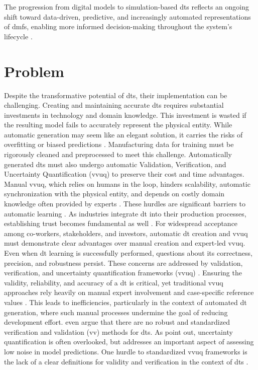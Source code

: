 The progression from digital models to simulation-based \gls{dt}s reflects an ongoing shift toward data-driven, predictive, and increasingly automated representations of \gls{dmfs}, enabling more informed decision-making throughout the system's lifecycle \autocite{boschert2016digital,lim2020state}.

\section{Problem}
\label{sec:problem}
Despite the transformative potential of \gls{dt}s, their implementation can be challenging. Creating and maintaining accurate \gls{dt}s requires substantial investments in technology and domain knowledge. This investment is wasted if the resulting model fails to accurately represent the physical entity. While automatic generation may seem like an elegant solution, it carries the risks of overfitting or biased predictions \autocite{gemanbias}. Manufacturing data for training must be rigorously cleaned and preprocessed to meet this challenge. Automatically generated \gls{dt}s must also undergo automatic Validation, Verification, and Uncertainty Quantification (\gls{vvuq}) to preserve their cost and time advantages. Manual \gls{vvuq}, which relies on humans in the loop, hinders scalability, automatic synchronization with the physical entity, and depends on costly domain knowledge often provided by experts \autocite{Bitencourt2023}. These hurdles are significant barriers to automatic learning \autocite{ribeiro2016should,zhao2024data}. As industries integrate \gls{dt} into their production processes, establishing trust becomes fundamental as well \autocite{trauer2022digital,arrieta2020explainable}. For widespread acceptance among co-workers, stakeholders, and investors, automatic \gls{dt} creation and \gls{vvuq} must demonstrate clear advantages over manual creation and expert-led \gls{vvuq}. Even when \gls{dt} learning is successfully performed, questions about its correctness, precision, and robustness persist. These concerns are addressed by validation, verification, and uncertainty quantification frameworks (\gls{vvuq}) \autocite{sel2025survey}. Ensuring the validity, reliability, and accuracy of a \gls{dt} is critical, yet traditional \gls{vvuq} approaches rely heavily on manual expert involvement and case-specific reference values \autocite{Bitencourt2023,hua2022validation}. This leads to inefficiencies, particularly in the context of automated \gls{dt} generation, where such manual processes undermine the goal of reducing development effort. \textcite{hua2022validation} even argue that there are no robust and standardized verification and validation (\gls{vv}) methods for \gls{dt}s. As \textcite{sel2025survey} point out, uncertainty quantification is often overlooked, but addresses an important aspect of assessing low noise in model predictions. One hurdle to standardized \gls{vvuq} frameworks is the lack of a clear definitions for validity and verification in the context of \gls{dt}s \autocite{Bitencourt2023}.

